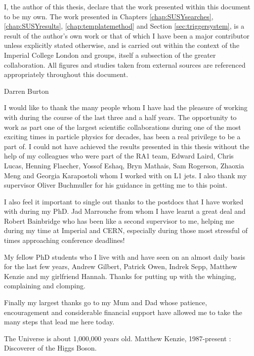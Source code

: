 \begin{declaration}
  I, the author of this thesis, declare that the work presented within this document to be my own.  The work presented in Chapters \ref{chap:SUSYsearches}, \ref{chap:SUSYresults},  \ref{chap:templatemethod} and Section \ref{sec:triggersystem}, is a result of the author's own work or that of which I have been a major contributor unless explicitly stated otherwise, and is carried out within the context of the Imperial College London and \CERN \SUSY groups, itself a subsection of the greater \CMS collaboration.  All figures and studies taken from external sources are referenced appropriately throughout this document.
  
  \vspace*{1cm}
  \begin{flushright}
    Darren Burton
  \end{flushright}
\end{declaration}


\begin{acknowledgements}
  I would like to thank the many people whom I have had the pleasure of working with during the course of the last three and a half years. The opportunity to work as part one of the largest scientific collaborations during one of the most exciting times in particle physics for decades, has been a real privilege to be a part of. I could not have achieved the results presented in this thesis without the help of my colleagues who were part of the RA1 team, Edward Laird, Chris Lucas, Henning Flaecher, Yossof Eshaq, Bryn Mathais, Sam Rogerson, Zhaoxia Meng and Georgia Karapostoli whom I worked with on L1 jets. I also thank my supervisor Oliver Buchmuller for his guidance in getting me to this point. 
 
I also feel it important to single out thanks to the postdocs that I have worked with during my PhD. Jad Marrouche from whom I have learnt a great deal and Robert Bainbridge who has been like a second supervisor to me, helping me during my time at Imperial and CERN, especially during those most stressful of times approaching conference deadlines! 

My fellow PhD students who I live with and have seen on an almost daily basis for the last few years, Andrew Gilbert, Patrick Owen, Indrek Sepp, Matthew Kenzie and my girlfriend Hannah. Thanks for putting up with the whinging, complaining and clomping. 

Finally my largest thanks go to my Mum and Dad whose patience, encouragement and considerable financial support have allowed me to take the many steps that lead me here today. 
 
\end{acknowledgements}

\tableofcontents
\listoffigures
\listoftables
\newpage

\frontquote%
  {The Universe is about 1,000,000 years old.}%
  {Matthew Kenzie, 1987-present : Discoverer of the Higgs Boson.}
